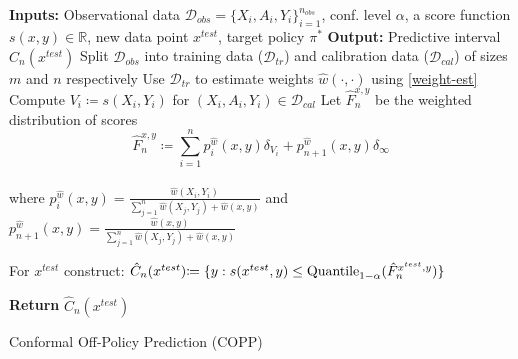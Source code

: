 \begin{algorithm}[!htp]
\SetAlgoLined
\textbf{Inputs:} Observational data $\mathcal{D}_{obs}=\{X_i, A_i, Y_i\}_{i=1}^{n_{obs}}$, conf. level $\alpha$, a score function $s(x,y)\in\mathbb{R}$, new data point $x^{test}$, target policy $\pi^*$ \;
\textbf{Output:} Predictive interval $\hat{C}_n(x^{test})$\;
Split $\mathcal{D}_{obs}$ into training data ($\mathcal{D}_{tr}$) and calibration data ($\mathcal{D}_{cal}$) of sizes $m$ and $n$ respectively\;
Use $\mathcal{D}_{tr}$ to estimate weights $\hat{w}(\cdot, \cdot)$ using \eqref{weight-est}\;
Compute $V_i \coloneqq s(X_i, Y_i)$ for $(X_i, A_i, Y_i) \in \mathcal{D}_{cal}$\;
Let $\hat{F}_{n}^{x, y}$ be the weighted distribution of scores 
$$\hat{F}_{n}^{x, y} \coloneqq  \sum_{i=1}^n p_i^{\hat{w}}(x, y) \delta_{V_i} + p_{n+1}^{\hat{w}}(x, y)\delta_{\infty}$$\\
where $p_i^{\hat{w}}(x, y) = \frac{\hat{w}(X_i, Y_i)}{\sum_{j=1}^n \hat{w}(X_j, Y_j) + \hat{w}(x, y)}$ and $p_{n+1}^{\hat{w}}(x, y) = \frac{\hat{w}(x, y)}{\sum_{j=1}^n \hat{w}(X_j, Y_j) + \hat{w}(x, y)}$\;


For $x^{test}$ construct:
$
    \hat{C}_n(x^{test})\hspace{-0.1cm} \coloneqq \{y: s(x^{test},y) \leq \text{Quantile}_{1-\alpha}(\hat{F}_{n}^{x^{test}, y})\} \nonumber
$

\textbf{Return} $\hat{C}_n(x^{test})$
  \caption{Conformal Off-Policy Prediction (COPP)}
  \label{cp_covariate_shift}
\end{algorithm}

